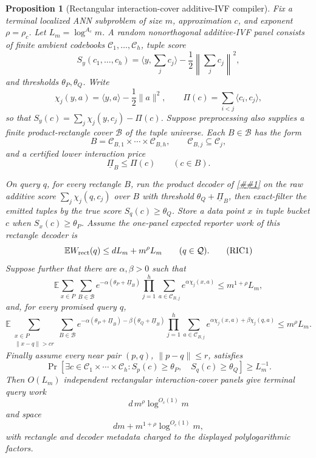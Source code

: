 \documentclass[10pt]{article}
\newcommand{\cref}[1]{\ref{##1}}
\newtheorem{proposition}[theorem]{Proposition}
\theoremstyle{definition}
\newcommand{\E}{\mathbb{E}}
\newcommand{\ip}[2]{\langle #1,#2\rangle}
\begin{document}
\begin{proposition}[Rectangular interaction-cover additive-IVF compiler]
   \label{prop:rectangular-interaction-cover-aq}
   Fix a terminal localized ANN subproblem of size \(m\), approximation \(c\),
   and exponent \(\rho=\rho_c\).  Let \(L_m=\log^{A_c}m\).  A random
   nonorthogonal additive-IVF panel consists of finite ambient codebooks
   \(\mathcal C_1,\ldots,\mathcal C_h\), tuple score
   \[
      S_y(c_1,\ldots,c_h)
      =
      \ip{y}{\sum_jc_j}
      -\frac12\left\|\sum_jc_j\right\|^2,
   \]
   and thresholds \(\theta_P,\theta_Q\).  Write
   \[
      \chi_j(y,a)=\ip{y}{a}-\frac12\|a\|^2,
      \qquad
      \Pi(c)=\sum_{i<j}\ip{c_i}{c_j},
   \]
   so that \(S_y(c)=\sum_j\chi_j(y,c_j)-\Pi(c)\).  Suppose preprocessing also
   supplies a finite product-rectangle cover \(\mathcal B\) of the tuple
   universe.  Each \(B\in\mathcal B\) has the form
   \[
      B=\mathcal C_{B,1}\times\cdots\times\mathcal C_{B,h},
      \qquad \mathcal C_{B,j}\subseteq\mathcal C_j,
   \]
   and a certified lower interaction price
   \[
      \underline\Pi_B\le \Pi(c)\qquad(c\in B).
      \tag{RIC0}
   \]

   On query \(q\), for every rectangle \(B\), run the product decoder of
   \cref{lem:additive-product-panel-decoder} on the raw additive score
   \(\sum_j\chi_j(q,c_j)\) over \(B\) with threshold
   \(\theta_Q+\underline\Pi_B\), then exact-filter the emitted tuples by the
   true score \(S_q(c)\ge\theta_Q\).  Store a data point \(x\) in tuple bucket
   \(c\) when \(S_x(c)\ge\theta_P\).  Assume the one-panel expected reporter
   work of this rectangle decoder is
   \[
      \E W_{\rm rect}(q)\le dL_m+m^\rho L_m
      \qquad(q\in\mathcal Q).
      \tag{RIC1}
   \]
   Suppose further that there are \(\alpha,\beta>0\) such that
   \[
      \E
      \sum_{x\in P}\sum_{B\in\mathcal B}
      e^{-\alpha(\theta_P+\underline\Pi_B)}
      \prod_{j=1}^h
      \sum_{a\in\mathcal C_{B,j}}e^{\alpha\chi_j(x,a)}
      \le m^{1+\rho}L_m,
      \tag{RIC2}
   \]
   and, for every promised query \(q\),
   \[
      \E
      \sum_{\substack{x\in P\\ \|x-q\|>cr}}
      \sum_{B\in\mathcal B}
      e^{-\alpha(\theta_P+\underline\Pi_B)
        -\beta(\theta_Q+\underline\Pi_B)}
      \prod_{j=1}^h
      \sum_{a\in\mathcal C_{B,j}}
      e^{\alpha\chi_j(x,a)+\beta\chi_j(q,a)}
      \le m^\rho L_m .
      \tag{RIC3}
   \]
   Finally assume every near pair \((p,q)\), \(\|p-q\|\le r\), satisfies
   \[
      \Pr\!\left[
      \exists c\in\mathcal C_1\times\cdots\times\mathcal C_h:
      S_p(c)\ge\theta_P,\quad S_q(c)\ge\theta_Q
      \right]\ge L_m^{-1}.
      \tag{RIC4}
   \]
   Then \(O(L_m)\) independent rectangular interaction-cover panels give
   terminal query work
   \[
      d\,m^\rho\log^{O_c(1)}m
   \]
   and space
   \[
      dm+m^{1+\rho}\log^{O_c(1)}m ,
   \]
   with rectangle and decoder metadata charged to the displayed polylogarithmic
   factors.
\end{proposition}
\end{document}
